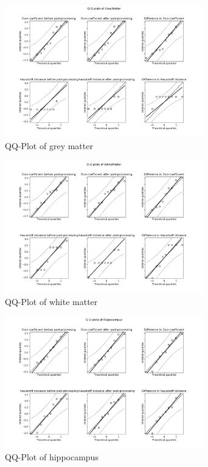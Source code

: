 \documentclass[journal]{IEEEtran}
\begin{document}
\begin{figure}[ht]
\centering
\includegraphics[width=3.4in]{img/QQ_plots_PKF/GreyMatter.png}
\caption{QQ-Plot of grey matter}
\label{fig_qq_gm}
\end{figure}

\begin{figure}[ht]
\centering
\includegraphics[width=3.4in]{MIALab_Report/img/QQ_plots_PKF/WhiteMatter.png}
\caption{QQ-Plot of white matter}
\label{fig_qq_wm}
\end{figure}

\begin{figure}[ht]
\centering
\includegraphics[width=3.4in]{MIALab_Report/img/QQ_plots_PKF/Hippocampus.png}
\caption{QQ-Plot of hippocampus}
\label{fig_qq_h}
\end{figure}
\end{document}
